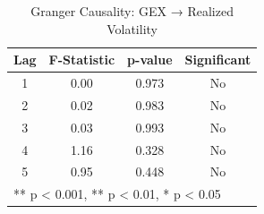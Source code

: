 \begin{table}[htbp]
\centering
\caption{Granger Causality: GEX → Realized Volatility}
\label{tab:granger}
\begin{tabular}{cccc}
\toprule
Lag & F-Statistic & p-value & Significant \\
\midrule
1 & 0.00 & 0.973 & No \\
2 & 0.02 & 0.983 & No \\
3 & 0.03 & 0.993 & No \\
4 & 1.16 & 0.328 & No \\
5 & 0.95 & 0.448 & No \\
\bottomrule
\multicolumn{4}{l}{\footnotesize *** p < 0.001, ** p < 0.01, * p < 0.05}
\end{tabular}
\end{table}
